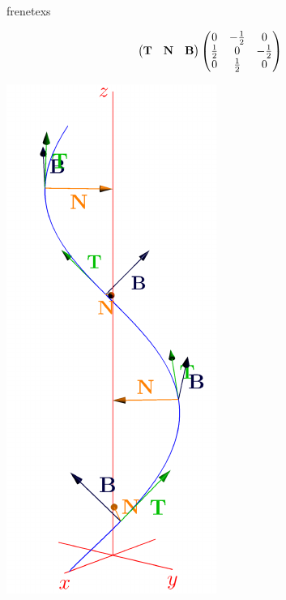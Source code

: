 \begin{examples}{}{frenetexs}
\begin{enumerate}
\begin{minipage}[t]{0.71\linewidth}
\[\begin{pmatrix}
  {\mathbf{T}}&{\mathbf{N}}&{\mathbf{B}}
  \end{pmatrix}\begin{pmatrix}
                    0&-\frac 12&0\\
                    \frac 12&0&-\frac 12\\
                    0&\frac 12&0
                    \end{pmatrix}\]
\end{minipage}\hfill\begin{minipage}[t]{0.28\linewidth}\vspace{-15pt}
\flushright\includegraphics{frenet-helixstill}
\end{minipage}\par


\end{enumerate}
\end{examples}
